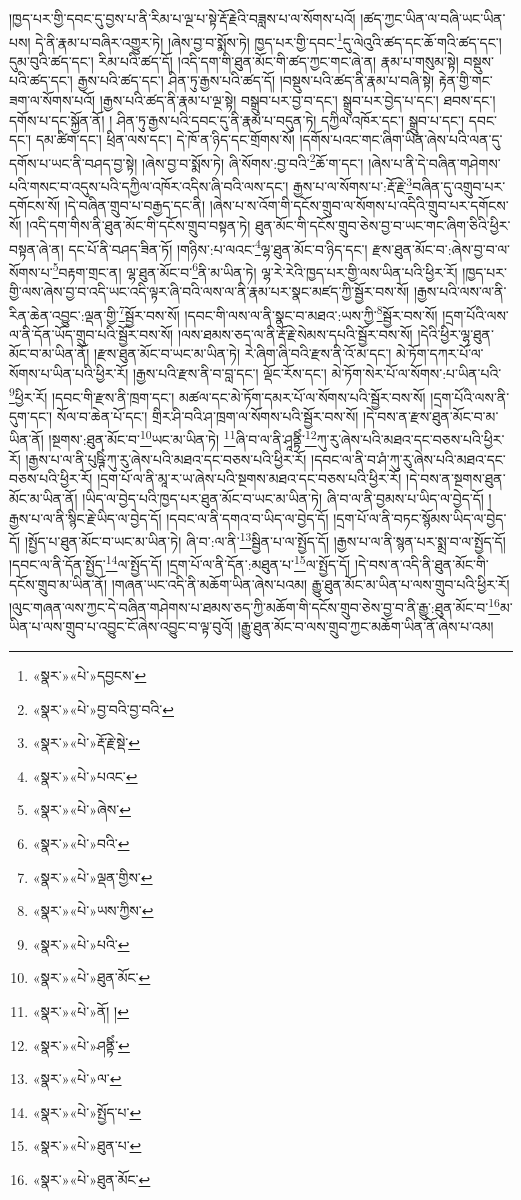 །ཁྱད་པར་གྱི་དབང་དུ་བྱས་པ་ནི་རིམ་པ་ལྔ་པ་སྟེ་རྡོ་རྗེའི་བཟླས་པ་ལ་སོགས་པའོ། །ཚད་ཀྱང་ཡིན་ལ་བཞི་ཡང་ཡིན་པས། དེ་ནི་རྣམ་པ་བཞིར་འགྱུར་ཏེ། །ཞེས་བྱ་བ་སྨོས་ཏེ། ཁྱད་པར་གྱི་དབང་\footnote{«སྣར་»«པེ་»དབྱངས་}དུ་ལེའུའི་ཚད་དང་ཆོ་གའི་ཚད་དང་། དུམ་བུའི་ཚད་དང་། རིམ་པའི་ཚད་དོ། །འདི་དག་གི་ཐུན་མོང་གི་ཚད་ཀྱང་གང་ཞེ་ན། རྣམ་པ་གསུམ་སྟེ། བསྡུས་པའི་ཚད་དང་། རྒྱས་པའི་ཚད་དང་། ཤིན་ཏུ་རྒྱས་པའི་ཚད་དོ། །བསྡུས་པའི་ཚད་ནི་རྣམ་པ་བཞི་སྟེ། རྟེན་གྱི་གང་ཟག་ལ་སོགས་པའོ། །རྒྱས་པའི་ཚད་ནི་རྣམ་པ་ལྔ་སྟེ། བསྒྲུབ་པར་བྱ་བ་དང་། སྒྲུབ་པར་བྱེད་པ་དང་། ཐབས་དང་། དགོས་པ་དང་སྐྱོན་ནོ། །
ཤིན་ཏུ་རྒྱས་པའི་དབང་དུ་ནི་རྣམ་པ་བདུན་ཏེ། དཀྱིལ་འཁོར་དང་། སྒྲུབ་པ་དང་། དབང་དང་། དམ་ཚིག་དང་། ཕྲིན་ལས་དང་། དེ་ཁོ་ན་ཉིད་དང་གྲོགས་སོ། །དགོས་པའང་གང་ཞིག་ཡིན་ཞེས་པའི་ལན་དུ་དགོས་པ་ཡང་ནི་བཤད་བྱ་སྟེ། །ཞེས་བྱ་བ་སྨོས་ཏེ། ཞི་སོགས་:བྱ་བའི་\footnote{«སྣར་»«པེ་»བྱ་བའི་བྱ་བའི་}ཆོ་ག་དང་། །ཞེས་པ་ནི་དེ་བཞིན་གཤེགས་པའི་གསང་བ་འདུས་པའི་དཀྱིལ་འཁོར་འདིས་ཞི་བའི་ལས་དང་། རྒྱས་པ་ལ་སོགས་པ་:རྡོ་རྗེ་\footnote{«སྣར་»«པེ་»རྡོ་རྗེ་སྡེ་}བཞིན་དུ་འགྲུབ་པར་དགོངས་སོ། །དེ་བཞིན་གྲུབ་པ་བརྒྱད་དང་ནི། །ཞེས་པ་ས་འོག་གི་དངོས་གྲུབ་ལ་སོགས་པ་འདིའི་གྲུབ་པར་དགོངས་སོ། །འདི་དག་གིས་ནི་ཐུན་མོང་གི་དངོས་གྲུབ་བསྟན་ཏེ། ཐུན་མོང་གི་དངོས་གྲུབ་ཅེས་བྱ་བ་ཡང་གང་ཞིག་ཅིའི་ཕྱིར་བསྟན་ཞེ་ན། དང་པོ་ནི་བཤད་ཟིན་ཏོ། །གཉིས་:པ་ལའང་\footnote{«སྣར་»«པེ་»པའང་}ལྷ་ཐུན་མོང་བ་ཉིད་དང་། རྫས་ཐུན་མོང་བ་:ཞེས་བྱ་བ་ལ་སོགས་པ་\footnote{«སྣར་»«པེ་»ཞེས་}བརྟག་གྲང་ན། ལྷ་ཐུན་མོང་བ་\footnote{«སྣར་»«པེ་»བའི་}ནི་མ་ཡིན་ཏེ། ལྷ་རེ་རེའི་ཁྱད་པར་གྱི་ལས་ཡིན་པའི་ཕྱིར་རོ། །ཁྱད་པར་གྱི་ལས་ཞེས་བྱ་བ་འདི་ཡང་འདི་ལྟར་ཞི་བའི་ལས་ལ་ནི་རྣམ་པར་སྣང་མཛད་ཀྱི་སྦྱོར་བས་སོ། །རྒྱས་པའི་ལས་ལ་ནི་རིན་ཆེན་འབྱུང་:ལྡན་གྱི་\footnote{«སྣར་»«པེ་»ལྡན་གྱིས་}སྦྱོར་བས་སོ། །དབང་གི་ལས་ལ་ནི་སྣང་བ་མཐའ་:ཡས་ཀྱི་\footnote{«སྣར་»«པེ་»ཡས་ཀྱིས་}སྦྱོར་བས་སོ། །དྲག་པོའི་ལས་ལ་ནི་དོན་ཡོད་གྲུབ་པའི་སྦྱོར་བས་སོ། །ལས་ཐམས་ཅད་ལ་ནི་རྡོ་རྗེ་སེམས་དཔའི་སྦྱོར་བས་སོ། །དེའི་ཕྱིར་ལྷ་ཐུན་མོང་བ་མ་ཡིན་ནོ། །རྫས་ཐུན་མོང་བ་ཡང་མ་ཡིན་ཏེ། རེ་ཞིག་ཞི་བའི་རྫས་ནི་འོ་མ་དང་། མེ་ཏོག་དཀར་པོ་ལ་སོགས་པ་ཡིན་པའི་ཕྱིར་རོ། །རྒྱས་པའི་རྫས་ནི་བ་བླ་དང་། ལྡོང་རོས་དང་། མེ་ཏོག་སེར་པོ་ལ་སོགས་:པ་ཡིན་པའི་\footnote{«སྣར་»«པེ་»པའི་}ཕྱིར་རོ། །དབང་གི་རྫས་ནི་ཁྲག་དང་། མཚལ་དང་མེ་ཏོག་དམར་པོ་ལ་སོགས་པའི་སྦྱོར་བས་སོ། །དྲག་པོའི་ལས་ནི་དུག་དང་། སོལ་བ་ཆེན་པོ་དང་། གྲིར་ཤི་བའི་ཤ་ཁྲག་ལ་སོགས་པའི་སྦྱོར་བས་སོ། །དེ་བས་ན་རྫས་ཐུན་མོང་བ་མ་ཡིན་ནོ། །སྔགས་:ཐུན་མོང་བ་\footnote{«སྣར་»«པེ་»ཐུན་མོང་}ཡང་མ་ཡིན་ཏེ། \footnote{«སྣར་»«པེ་»ནོ། ། }ཞི་བ་ལ་ནི་ཤཱནྟིཾ་\footnote{«སྣར་»«པེ་»ཤནྟིཾ་}ཀུ་རུ་ཞེས་པའི་མཐའ་དང་བཅས་པའི་ཕྱིར་རོ། །རྒྱས་པ་ལ་ནི་པུཥྚིཾ་ཀུ་རུ་ཞེས་པའི་མཐའ་དང་བཅས་པའི་ཕྱིར་རོ། །དབང་ལ་ནི་བ་ཤཾ་ཀུ་རུ་ཞེས་པའི་མཐའ་དང་བཅས་པའི་ཕྱིར་རོ། །དྲག་པོ་ལ་ནི་མཱ་ར་ཡ་ཞེས་པའི་སྔགས་མཐའ་དང་བཅས་པའི་ཕྱིར་རོ། །དེ་བས་ན་སྔགས་ཐུན་མོང་མ་ཡིན་ནོ། །ཡིད་ལ་བྱེད་པའི་ཁྱད་པར་ཐུན་མོང་བ་ཡང་མ་ཡིན་ཏེ། ཞི་བ་ལ་ནི་བྱམས་པ་ཡིད་ལ་བྱེད་དོ། །རྒྱས་པ་ལ་ནི་སྙིང་རྗེ་ཡིད་ལ་བྱེད་དོ། །དབང་ལ་ནི་དགའ་བ་ཡིད་ལ་བྱེད་དོ། །དྲག་པོ་ལ་ནི་བཏང་སྙོམས་ཡིད་ལ་བྱེད་དོ། །སྤྱོད་པ་ཐུན་མོང་བ་ཡང་མ་ཡིན་ཏེ། ཞི་བ་:ལ་ནི་\footnote{«སྣར་»«པེ་»ལ་}སྦྱིན་པ་ལ་སྤྱོད་དོ། །རྒྱས་པ་ལ་ནི་སྙན་པར་སྨྲ་བ་ལ་སྤྱོད་དོ། །དབང་ལ་ནི་དོན་སྤྱོད་\footnote{«སྣར་»«པེ་»སྤྱོད་པ་}ལ་སྤྱོད་དོ། །དྲག་པོ་ལ་ནི་དོན་:མཐུན་པ་\footnote{«སྣར་»«པེ་»ཐུན་པ་}ལ་སྤྱོད་དོ། །དེ་བས་ན་འདི་ནི་ཐུན་མོང་གི་དངོས་གྲུབ་མ་ཡིན་ནོ། །གཞན་ཡང་འདི་ནི་མཆོག་ཡིན་ཞེས་པའམ། རྒྱུ་ཐུན་མོང་མ་ཡིན་པ་ལས་གྲུབ་པའི་ཕྱིར་རོ། །ལུང་གཞན་ལས་ཀྱང་དེ་བཞིན་གཤེགས་པ་ཐམས་ཅད་ཀྱི་མཆོག་གི་དངོས་གྲུབ་ཅེས་བྱ་བ་ནི་རྒྱུ་:ཐུན་མོང་བ་\footnote{«སྣར་»«པེ་»ཐུན་མོང་}མ་ཡིན་པ་ལས་གྲུབ་པ་འབྱུང་ངོ་ཞེས་འབྱུང་བ་ལྟ་བུའོ། །རྒྱུ་ཐུན་མོང་བ་ལས་གྲུབ་ཀྱང་མཆོག་ཡིན་ནོ་ཞེས་པ་འམ། 